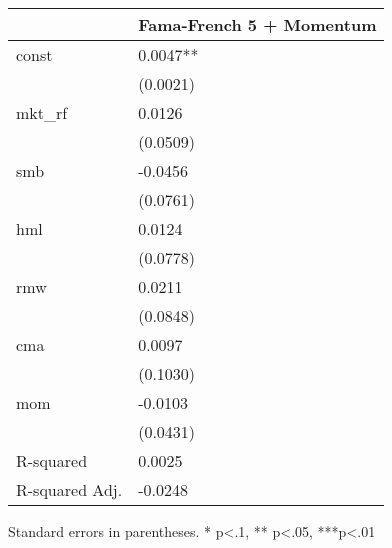 \begin{table}
\caption{}
\label{}
\begin{center}
\begin{tabular}{ll}
\hline
               & Fama-French 5 + Momentum  \\
\hline
const          & 0.0047**                  \\
               & (0.0021)                  \\
mkt\_rf        & 0.0126                    \\
               & (0.0509)                  \\
smb            & -0.0456                   \\
               & (0.0761)                  \\
hml            & 0.0124                    \\
               & (0.0778)                  \\
rmw            & 0.0211                    \\
               & (0.0848)                  \\
cma            & 0.0097                    \\
               & (0.1030)                  \\
mom            & -0.0103                   \\
               & (0.0431)                  \\
R-squared      & 0.0025                    \\
R-squared Adj. & -0.0248                   \\
\hline
\end{tabular}
\end{center}
\end{table}
\bigskip
Standard errors in parentheses. \newline 
* p<.1, ** p<.05, ***p<.01